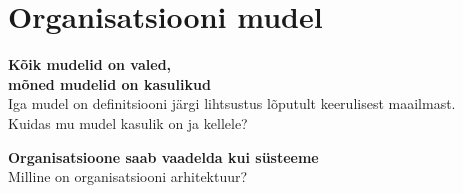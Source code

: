 \documentclass{beamer}
\begin{document}
\section{Organisatsiooni mudel}
\begin{frame}[fragile]
	\begin{center}
		\LARGE{\textbf{Kõik mudelid on valed, \\mõned mudelid on kasulikud}}
		\\[4cm]
		\small{Iga mudel on definitsiooni järgi lihtsustus lõputult keerulisest maailmast.\\Kuidas mu mudel kasulik on ja kellele?}
	\end{center}
\end{frame}

\begin{frame}[fragile]
	\begin{center}
		\LARGE{\textbf{Organisatsioone saab vaadelda kui süsteeme}}
		\\[4cm]
		\small{Milline on organisatsiooni arhitektuur?}
	\end{center}
\end{frame}
\end{document}
